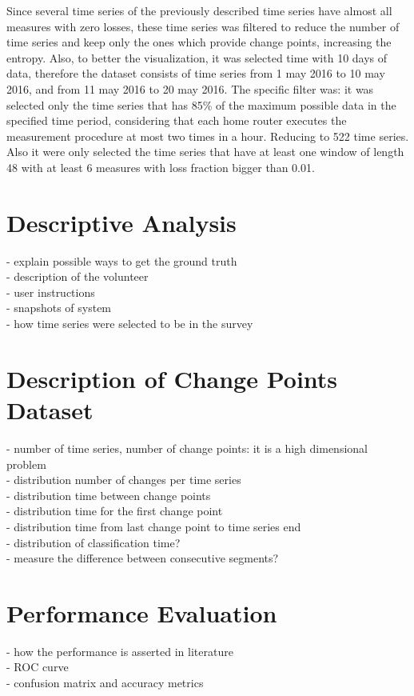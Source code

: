 Since several time series of the previously described time series have almost all measures with zero losses, these time series was filtered to reduce the number of time series and keep only the ones which provide change points, increasing the entropy. Also, to better the visualization, it was selected time with 10 days of data, therefore the dataset consists of time series from 1 may 2016 to 10 may 2016, and from 11 may 2016 to 20 may 2016. The specific filter was: it was selected only the time series that has 85\% of the maximum possible data in the specified time period, considering that each home router executes the measurement procedure at most two times in a hour. Reducing to 522 time series. Also it were only selected the time series that have at least one window of length 48 with at least 6 measures with loss fraction bigger than 0.01.

\section{Descriptive Analysis}

- explain possible ways to get the ground truth\\
- description of the volunteer\\
- user instructions\\
- snapshots of system\\ 
- how time series were selected to be in the survey\\

\section{Description of Change Points Dataset}

- number of time series, number of change points: it is a high dimensional problem\\
- distribution number of changes per time series\\
- distribution time between change points\\
- distribution time for the first change point\\
- distribution time from last change point to time series end\\
- distribution of classification time?\\
- measure the difference between consecutive segments?\\

\section{Performance Evaluation}

- how the performance is asserted in literature\\
- ROC curve\\
- confusion matrix and accuracy metrics\\
